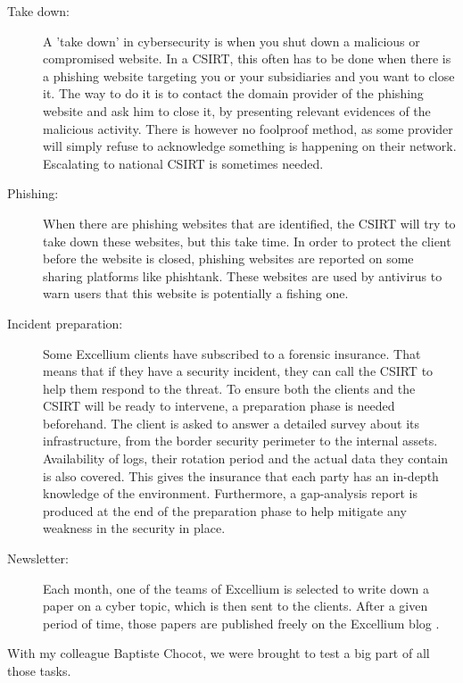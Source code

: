 \documentclass{tnreport}
\begin{document}
\begin{description}
    \item[Take down:] A 'take down' in cybersecurity is when you shut down a malicious or compromised website. In a \gls{CSIRT}, this often has to be done when there is a phishing website targeting you or your subsidiaries and you want to close it. The way to do it is to contact the domain provider of the phishing website and ask him to close it, by presenting relevant evidences of the malicious activity. There is however no foolproof method, as some provider will simply refuse to acknowledge something is happening on their network. Escalating to national CSIRT is sometimes needed.
    \item[Phishing:] When there are phishing websites that are identified, the CSIRT will try to take down these websites, but this take time. In order to protect the client before the website is closed, phishing websites are reported on some sharing platforms like phishtank. These websites are used by antivirus to warn users that this website is potentially a fishing one.
    \item[Incident preparation:] Some \gls{Excellium} clients have subscribed to a forensic insurance. That means that if they have a security incident, they can call the \gls{CSIRT} to help them respond to the threat. To ensure both the clients and the \gls{CSIRT} will be ready to intervene, a preparation phase is needed beforehand. The client is asked to answer a detailed survey about its infrastructure, from the border security perimeter to the internal assets. Availability of logs, their rotation period and the actual data they contain is also covered. This gives the insurance that each party has an in-depth knowledge of the environment. Furthermore, a gap-analysis report is produced at the end of the preparation phase to help mitigate any weakness in the security in place.
    \item[Newsletter:] Each month, one of the teams of \gls{Excellium} is selected to write down a paper on a cyber topic, which is then sent to the clients. After a given period of time, those papers are published freely on the \gls{Excellium} blog \cite{lib23}.
\end{description}

With my colleague Baptiste Chocot, we were brought to test a big part of all those tasks. 
\end{document}
